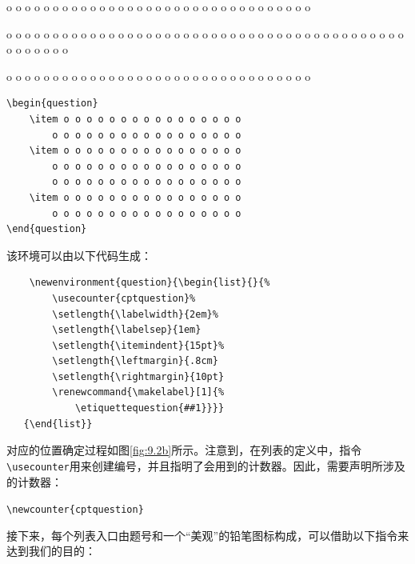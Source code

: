 \begin{codelist}[9.19]{
    \begin{question}
        \item o o o o o o o o o o o o o o o o
            o o o o o o o o o o o o o o o o o
        \item o o o o o o o o o o o o o o o o
            o o o o o o o o o o o o o o o o o
            o o o o o o o o o o o o o o o o o
        \item o o o o o o o o o o o o o o o o
            o o o o o o o o o o o o o o o o o
    \end{question}
}\begin{verbatim}
\begin{question}
    \item o o o o o o o o o o o o o o o o
        o o o o o o o o o o o o o o o o o
    \item o o o o o o o o o o o o o o o o
        o o o o o o o o o o o o o o o o o
        o o o o o o o o o o o o o o o o o
    \item o o o o o o o o o o o o o o o o
        o o o o o o o o o o o o o o o o o
\end{question}
\end{verbatim}
\end{codelist}

该环境可以由以下代码生成：

\begin{dmd}
\begin{verbatim}
    \newenvironment{question}{\begin{list}{}{% 
        \usecounter{cptquestion}% 
        \setlength{\labelwidth}{2em}% 
        \setlength{\labelsep}{1em} 
        \setlength{\itemindent}{15pt}% 
        \setlength{\leftmargin}{.8cm} 
        \setlength{\rightmargin}{10pt} 
        \renewcommand{\makelabel}[1]{%
            \etiquettequestion{##1}}}}
   {\end{list}}
\end{verbatim}
\end{dmd}

对应的位置确定过程如图\ref{fig:9.2b}所示。注意到，在列表的定义中，指令\verb|\usecounter|用来创建编号，并且指明了会用到的计数器。因此，需要声明所涉及的计数器：

\begin{dmd}
\verb+\newcounter{cptquestion}+
\end{dmd}

接下来，每个列表入口由题号和一个“美观”的铅笔图标构成，可以借助以下指令来达到我们的目的：


